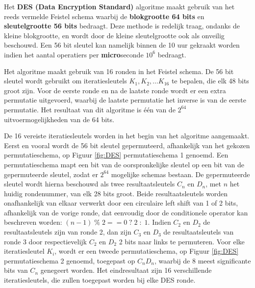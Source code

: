 \documentclass{report}
\begin{document}
	Het \textbf{DES (Data Encryption Standard)} algoritme maakt gebruik van het reeds vermelde Feistel schema waarbij de \textbf{blokgrootte 64 bits} en \textbf{sleutelgrootte 56 bits} bedraagt. Deze methode is redelijk traag, ondanks de kleine blokgrootte, en wordt door de kleine sleutelgrootte ook als onveilig beschouwd. Een 56 bit sleutel kan namelijk binnen de 10 uur gekraakt worden indien het aantal operatiers per \textbf{micro}seconde $10^6$ bedraagt. 
	
	Het algoritme maakt gebruik van 16 ronden in het Feistel schema. De 56 bit sleutel wordt gebruikt om iteratiesleutels $K_1, K_2, ... K_{16}$ te bepalen, die elk 48 bits groot zijn. Voor de eerste ronde en na de laatste ronde wordt er een extra permutatie uitgevoerd, waarbij de laatste permutatie het inverse is van de eerste permutatie. Het resultaat van dit algoritme is één van de $2^{64}$ uitvoermogelijkheden van de 64 bits. 

	De 16 vereiste iteratiesleutels worden in het begin van het algoritme aangemaakt. Eerst en vooral wordt de 56 bit sleutel gepermuteerd, afhankelijk van het gekozen permutatieschema, op Figuur \ref{fig:DES} permutatieschema 1 genoemd. Een permutatieschema mapt een bit van de oorspronkelijke sleutel op een bit van de gepermuteerde sleutel, zodat er $2^{64}$ mogelijke schemas bestaan. De gepermuteerde sleutel wordt hierna beschouwd als twee resultaatsleutels $C_n$ en $D_n$, met $n$ het huidig rondenummer, van elk 28 bits groot. Beide resultaatsleutels worden onafhankelijk van elkaar verwerkt door een circulaire left shift van 1 of 2 bits, afhankelijk van de vorige ronde, dat eenvoudig door de conditionele operator kan beschreven worden: $(n - 1)\;\%\;2 == 0\;?\;2\;:\;1$. Indien $C_2$ en $D_2$ de resultaatsleutels zijn van ronde 2, dan zijn $C_3$ en $D_3$ de resultaatsleutels van ronde 3 door respectievelijk $C_2$ en $D_2$ 2 bits naar links te permuteren. Voor elke iteratiesleutel $K_i$, wordt er een tweede permutatieschema, op Figuur \ref{fig:DES} permutatieschema 2 genoemd, toegepast op $C_nD_n$, waarbij de 8 meest significante bits van $C_n$ genegeert worden. Het eindresultaat zijn 16 verschillende iteratiesleutels, die zullen toegepast worden bij elke DES ronde. 
\end{document}
